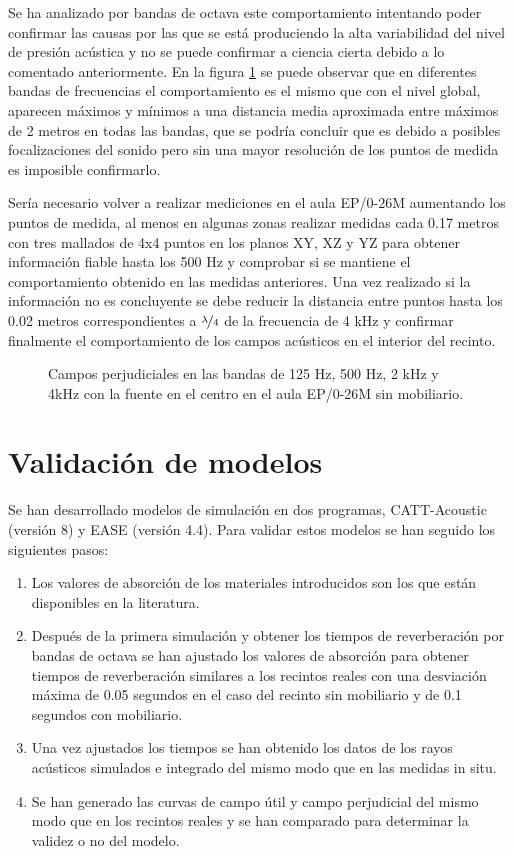 Se ha analizado por bandas de octava este comportamiento intentando poder confirmar las causas por las que se está produciendo la alta variabilidad del nivel de presión acústica y no se puede confirmar a ciencia cierta debido a lo comentado anteriormente. En la figura \ref{graf:mapaepsperjudicial125} se puede observar que en diferentes bandas de frecuencias el comportamiento es el mismo que con el nivel global, aparecen máximos y mínimos a una distancia media aproximada entre máximos de 2 metros en todas las bandas, que se podría concluir que es debido a posibles focalizaciones del sonido pero sin una mayor resolución de los puntos de medida es imposible confirmarlo.

Sería necesario volver a realizar mediciones en el aula EP/0-26M aumentando los puntos de medida, al menos en algunas zonas realizar medidas cada 0.17 metros con tres mallados de 4x4 puntos en los planos XY, XZ y YZ para obtener información fiable hasta los 500 Hz y comprobar si se mantiene el comportamiento obtenido en las medidas anteriores. Una vez realizado si la información no es concluyente se debe reducir la distancia entre puntos hasta los 0.02 metros correspondientes a $\nicefrac{\lambda}{4}$ de la frecuencia de 4 kHz y confirmar finalmente el comportamiento de los campos acústicos en el interior del recinto.

\begin{figure}[ht]
    \centering%
        {%
    }
    \caption{Campos perjudiciales en las bandas de 125 Hz, 500 Hz, 2 kHz y 4kHz con la fuente en el centro en el aula EP/0-26M sin mobiliario.}
    \label{graf:mapaepsperjudicial125}%
\end{figure}
\FloatBarrier 

\section{Validación de modelos}
\label{validaciondemodelos}

Se han desarrollado modelos de simulación en dos programas, CATT-Acoustic (versión 8) y EASE (versión 4.4). Para validar estos modelos se han seguido los siguientes pasos:
\begin{enumerate}
\itemsep0em
  \item Los valores de absorción de los materiales introducidos son los que están disponibles en la literatura.
  \item Después de la primera simulación y obtener los tiempos de reverberación por bandas de octava se han ajustado los valores de absorción para obtener tiempos de reverberación similares a los recintos reales con una desviación máxima de 0.05 segundos en el caso del recinto sin mobiliario y de 0.1 segundos con mobiliario.
  \item Una vez ajustados los tiempos se han obtenido los datos de los rayos acústicos simulados e integrado del mismo modo que en las medidas in situ.
  \item Se han generado las curvas de campo útil y campo perjudicial del mismo modo que en los recintos reales y se han comparado para determinar la validez o no del modelo.
\end{enumerate}

